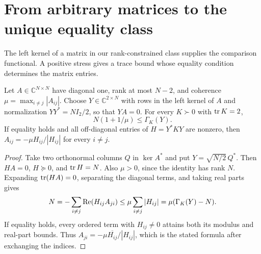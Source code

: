 \section{From arbitrary matrices to the unique equality class}\label{sec:proof}
The left kernel of a matrix in our rank-constrained class supplies the
comparison functional. A positive stress gives a trace bound whose
equality condition determines the matrix entries.

\begin{lemma}\label{lem:trace}
Let $A\in\mathbb C^{N\times N}$ have diagonal one, rank at most $N-2$,
and coherence $\mu=\max_{i\ne j}|A_{ij}|$. Choose
$Y\in\mathbb C^{2\times N}$ with rows in the left kernel of $A$ and
normalization $YY^*=NI_2/2$, so that $YA=0$.
For every $K\succ0$ with $\operatorname{tr} K=2$,
\begin{equation}\label{eq:trace-bound}
 N(1+1/\mu)\le\Gamma_K(Y).
\end{equation}
If equality holds and all off-diagonal entries of $H=Y^*KY$ are nonzero,
then $A_{ij}=-\mu H_{ij}/|H_{ij}|$ for every $i\ne j$.
\end{lemma}
\begin{proof}
Take two orthonormal columns $Q$ in $\ker A^*$ and put
$Y=\sqrt{N/2}\,Q^*$. Then $HA=0$, $H\succeq0$, and $\operatorname{tr} H=N$.
Also $\mu>0$, since the identity has rank $N$. Expanding
$\operatorname{tr}(HA)=0$, separating the diagonal terms, and taking real parts gives
\[
 N=-\sum_{i\ne j}\operatorname{Re}(H_{ij}A_{ji})
 \le\mu\sum_{i\ne j}|H_{ij}|=\mu(\Gamma_K(Y)-N).
\]
If equality holds, every ordered term with $H_{ij}\ne0$ attains both
its modulus and real-part bounds. Thus
$A_{ji}=-\mu\overline{H_{ij}}/|H_{ij}|$, which is the stated formula
after exchanging the indices.
\end{proof}

